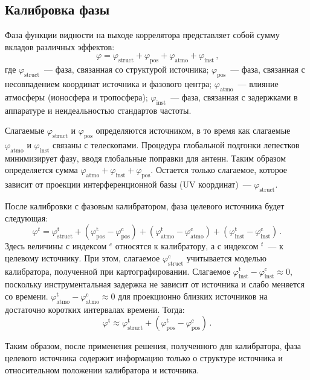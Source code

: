 \subsection{Калибровка фазы}
Фаза функции видности на выходе коррелятора представляет собой сумму вкладов различных эффектов:
\[
 \varphi = \varphi_\text{struct} + \varphi_\text{pos} + \varphi_\text{atmo} +
\varphi_\text{inst} \, \text{,}
\]
где $\varphi_\text{struct}$~--- фаза, связанная со структурой источника;
$\varphi_\text{pos}$~--- фаза, связанная с несовпадением координат источника и фазового центра;
$\varphi_\text{atmo}$~--- влияние атмосферы (ионосфера и тропосфера); $\varphi_\text{inst}$~---
фаза, связанная с задержками в аппаратуре и неидеальностью стандартов частоты.

Слагаемые $\varphi_\text{struct}$ и $\varphi_\text{pos}$ определяются источником, в то время
как слагаемые $\varphi_\text{atmo}$ и $\varphi_\text{inst}$ связаны с телескопами. Процедура
глобальной подгонки лепестков минимизирует фазу, вводя глобальные поправки для антенн. Таким
образом определяется сумма $\varphi_\text{atmo} + \varphi_\text{inst} + \varphi_\text{pos}$.
Остается только слагаемое, которое зависит от проекции интерференционной базы (UV координат)~---
$\varphi_\text{struct}$.

После калибровки с фазовым калибратором, фаза целевого источника будет следующая:
\[
 \varphi^{t} = \varphi_\text{struct}^\text{t} + (\varphi_\text{pos}^\text{t} -
\varphi_\text{pos}^\text{c}) + (\varphi_\text{atmo}^\text{t} -
\varphi_\text{atmo}^\text{c}) +  (\varphi_\text{inst}^\text{t} -
\varphi_\text{inst}^\text{c}) \,.
\]
Здесь величины с индексом $^c$ относятся к калибратору, а с индексом $^t$~--- к целевому источнику.
При этом, слагаемое $\varphi_\text{struct}^\text{c}$ учитывается моделью калибратора, полученной
при картографировании. Слагаемое $\varphi_\text{inst}^\text{t} -
\varphi_\text{inst}^\text{c} \approx 0$, поскольку инструментальная задержка не зависит от
источника и слабо меняется со времени. $\varphi_\text{atmo}^\text{t} -
\varphi_\text{atmo}^\text{c} \approx 0$ для проекционно близких источников на достаточно
коротких интервалах времени. Тогда:
\[
 \varphi^\text{t} \approx \varphi_\text{struct}^\text{t} + (\varphi_\text{pos}^\text{t} -
\varphi_\text{pos}^\text{c}) \,\text{.}
\]

Таким образом, после применения решения, полученного для калибратора, фаза целевого источника
содержит информацию только о структуре источника и относительном положении калибратора и источника.

